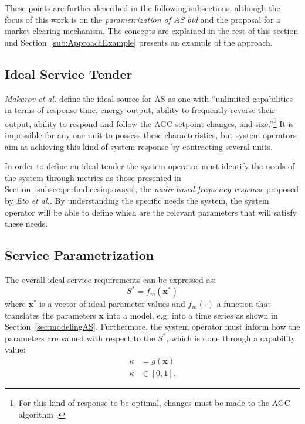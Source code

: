 These points are further described in the following subsections, although the focus of this work is on the \emph{parametrization of AS bid} and the proposal for a market clearing mechanism. The concepts are explained in the rest of this section and Section~\ref{sub:ApproachExample} presents an example of the approach.
\subsection*{Ideal Service Tender} %
\label{sub:IdealServiceTender}
\emph{Makarov et al.} define the ideal source for AS as one with ``unlimited capabilities in terms of response time, energy output, ability to frequently reverse their output, ability to respond and follow the AGC setpoint changes, and size.''\footnote{For this kind of response to be optimal, changes must be made to the AGC algorithm \cite{peydayesh2012effects}.} It is impossible for any one unit to possess these characteristics, but system operators aim at achieving this kind of system response by contracting several units.

In order to define an ideal tender the system operator must identify the needs of the system through metrics as those presented in Section~\ref{subsec:perfindicesinpowsys}, \eg the \emph{nadir-based frequency response} proposed by \emph{Eto et al.}. By understanding the specific needs the system, the system operator will be able to define which are the relevant parameters that will satisfy these needs.
\subsection*{Service Parametrization} %
\label{sub:ServiceParametrization}
The overall ideal service requirements can be expressed as:
\begin{equation}
	S^* = f_m(\textbf{x}^*) \label{eq:optimaltender}
\end{equation}
where $\textbf{x}^*$ is a vector of ideal parameter values and $f_m(\cdot)$ a function that translates the parameters $\textbf{x}$ into a model, e.g. into a time series as shown in Section~\ref{sec:modelingAS}. Furthermore, the system operator must inform how the parameters are valued with respect to the $S^*$, which is done through a capability value:
\begin{align}
    \kappa &= g(\mathbf{x}) \\
    \kappa &\in [0,1].
\end{align}

